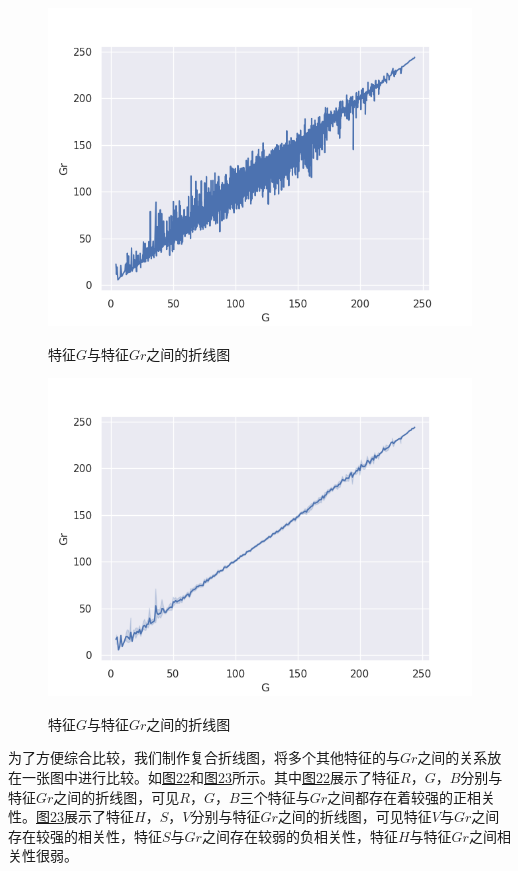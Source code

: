 \documentclass[UTF8]{ctexart}
\begin{document}
	\begin{figure}[htbp]
		\centering
		\caption{特征$G$与特征$Gr$之间的折线图}
		\includegraphics[width=1.0\textwidth]{line_g_gr.png}
		\label{Fig.20}
	\end{figure}

	\begin{figure}[htbp]
	\centering
	\caption{特征$G$与特征$Gr$之间的折线图}
	\includegraphics[width=1.0\textwidth]{line_g_gr_round.png}
	\label{Fig.21}
	\end{figure}
	
	为了方便综合比较，我们制作复合折线图，将多个其他特征的与$Gr$之间的关系放在一张图中进行比较。如\hyperref[Fig.22]{图22}和\hyperref[Fig.23]{图23}所示。其中\hyperref[Fig.22]{图22}展示了特征$R$，$G$，$B$分别与特征$Gr$之间的折线图，可见$R$，$G$，$B$三个特征与$Gr$之间都存在着较强的正相关性。\hyperref[Fig.23]{图23}展示了特征$H$，$S$，$V$分别与特征$Gr$之间的折线图，可见特征$V$与$Gr$之间存在较强的相关性，特征$S$与$Gr$之间存在较弱的负相关性，特征$H$与特征$Gr$之间相关性很弱。
	
\end{document}
